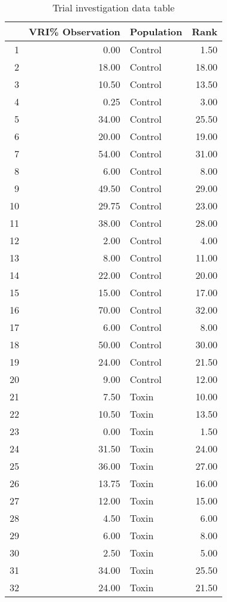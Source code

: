 \begin{table}[ht]
\centering
\begin{tabular}{rrlr}
  \hline
 & VRI\% Observation & Population & Rank \\ 
  \hline
1 & 0.00 & Control & 1.50 \\ 
  2 & 18.00 & Control & 18.00 \\ 
  3 & 10.50 & Control & 13.50 \\ 
  4 & 0.25 & Control & 3.00 \\ 
  5 & 34.00 & Control & 25.50 \\ 
  6 & 20.00 & Control & 19.00 \\ 
  7 & 54.00 & Control & 31.00 \\ 
  8 & 6.00 & Control & 8.00 \\ 
  9 & 49.50 & Control & 29.00 \\ 
  10 & 29.75 & Control & 23.00 \\ 
  11 & 38.00 & Control & 28.00 \\ 
  12 & 2.00 & Control & 4.00 \\ 
  13 & 8.00 & Control & 11.00 \\ 
  14 & 22.00 & Control & 20.00 \\ 
  15 & 15.00 & Control & 17.00 \\ 
  16 & 70.00 & Control & 32.00 \\ 
  17 & 6.00 & Control & 8.00 \\ 
  18 & 50.00 & Control & 30.00 \\ 
  19 & 24.00 & Control & 21.50 \\ 
  20 & 9.00 & Control & 12.00 \\ 
  21 & 7.50 & Toxin & 10.00 \\ 
  22 & 10.50 & Toxin & 13.50 \\ 
  23 & 0.00 & Toxin & 1.50 \\ 
  24 & 31.50 & Toxin & 24.00 \\ 
  25 & 36.00 & Toxin & 27.00 \\ 
  26 & 13.75 & Toxin & 16.00 \\ 
  27 & 12.00 & Toxin & 15.00 \\ 
  28 & 4.50 & Toxin & 6.00 \\ 
  29 & 6.00 & Toxin & 8.00 \\ 
  30 & 2.50 & Toxin & 5.00 \\ 
  31 & 34.00 & Toxin & 25.50 \\ 
  32 & 24.00 & Toxin & 21.50 \\ 
   \hline
\end{tabular}
\caption{Trial investigation data table}
\end{table}
